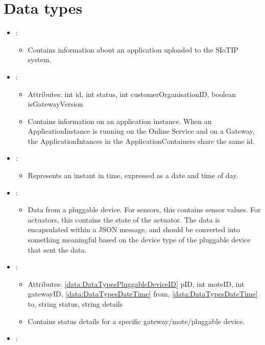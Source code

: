 \section{Data types}\label{sec:datatypes}
\begin{itemize}[nolistsep,noitemsep]
\item {}: 
\begin{itemize}[noitemsep,nolistsep]

\item[] Contains information about an application uploaded to the SIoTIP system.
\end{itemize}
\item {}: 
\begin{itemize}[noitemsep,nolistsep]
\item[] Attributes: int id, int status, int customerOrganisationID, boolean isGatewayVersion
\item[] Contains information on an application instance.
When an ApplicationInstance is running on the Online Service and on a Gateway, the ApplicationIntances in the ApplicationContainers share the same id.
\end{itemize}
\item {}: 
\begin{itemize}[noitemsep,nolistsep]

\item[] Represents an instant in time, expressed as a date and time of day.
\end{itemize}
\item {}: 
\begin{itemize}[noitemsep,nolistsep]

\item[] Data from a pluggable device. For sensors, this contains sensor values. For actuators, this contains the state of the actuator. The data is encapsulated within a JSON message, and should be converted into something meaningful based on the device type of the pluggable device that sent the data.
\end{itemize}
\item {}: 
\begin{itemize}[noitemsep,nolistsep]
\item[] Attributes: \ref{data:DataTypesPluggableDeviceID} pID, int moteID, int gatewayID, \ref{data:DataTypesDateTime} from, \ref{data:DataTypesDateTime} to, string status, string details
\item[] Contains status details for a specific gateway/mote/pluggable device.
\end{itemize}
\item {}: 
\begin{itemize}


\end{itemize}
\end{itemize}

